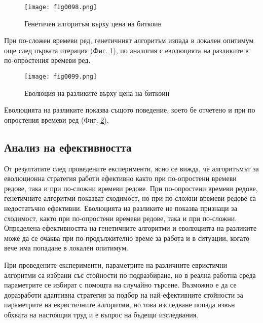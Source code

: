 \begin{figure}[H]
  \centering
  \texttt{[image: fig0098.png]}
  \caption{Генетичен алгоритъм върху цена на биткоин}
\label{fig0098}
\end{figure}

При по-сложен времеви ред, генетичният алгоритъм изпада в локален опитимум още след първата итерация (Фиг. \ref{fig0098}), по аналогия с еволюцията на разликите в по-опростения времеви ред.

\begin{figure}[H]
  \centering
  \texttt{[image: fig0099.png]}
  \caption{Еволюция на разликите върху цена на биткоин}
\label{fig0099}
\end{figure}

Еволюцията на разликите показва същото поведение, което бе отчетено и при по опростения времеви ред (Фиг. \ref{fig0099}).

\subsection{Анализ на ефективността}

От резултатите след проведените експерименти, ясно се вижда, че алгоритъмът за еволюционна стратегия работи ефективно както при по-опростени времеви редове, така и при по-сложни времеви редове. При по-опростени времеви редове, генетичните алгоритми показват сходимост, но при по-сложни времеви редове са недостатъчно ефективни. Еволюцията на разликите не показва признаци за сходимост, както при по-опростени времеви редове, така и при по-сложни. Определена ефективността на генетичните алгоритми и еволюцията на разликите може да се очаква при по-продължително време за работа и в ситуации, когато вече има попадане в локален опитимум. 

При проведените експерименти, параметрите на различните евристични алгоритми са избрани със стойности по подразбиране, но в реална работна среда параметрите се избират с помощта на случайно търсене. Възможно е да се доразработи адаптивна стратегия за подбор на най-ефективните стойности за параметрите на евристичните алгоритми, но това изследване попада извън обхвата на настоящия труд и е въпрос на бъдещи изследвания. 

